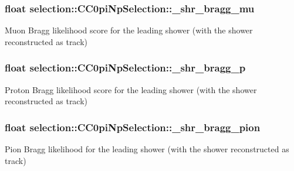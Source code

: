 \subsubsection[{\texorpdfstring{\+\_\+shr\+\_\+bragg\+\_\+mu}{_shr_bragg_mu}}]{\setlength{\rightskip}{0pt plus 5cm}float selection\+::\+C\+C0pi\+Np\+Selection\+::\+\_\+shr\+\_\+bragg\+\_\+mu\hspace{0.3cm}{\ttfamily [private]}}\hypertarget{classselection_1_1CC0piNpSelection_a6ef67d022fce5058985773010161b7cb}{}\label{classselection_1_1CC0piNpSelection_a6ef67d022fce5058985773010161b7cb}
Muon Bragg likelihood score for the leading shower (with the shower reconstructed as track) 
\subsubsection[{\texorpdfstring{\+\_\+shr\+\_\+bragg\+\_\+p}{_shr_bragg_p}}]{\setlength{\rightskip}{0pt plus 5cm}float selection\+::\+C\+C0pi\+Np\+Selection\+::\+\_\+shr\+\_\+bragg\+\_\+p\hspace{0.3cm}{\ttfamily [private]}}\hypertarget{classselection_1_1CC0piNpSelection_acb447ca93f046abd1540291ba0d41e73}{}\label{classselection_1_1CC0piNpSelection_acb447ca93f046abd1540291ba0d41e73}
Proton Bragg likelihood score for the leading shower (with the shower reconstructed as track) 
\subsubsection[{\texorpdfstring{\+\_\+shr\+\_\+bragg\+\_\+pion}{_shr_bragg_pion}}]{\setlength{\rightskip}{0pt plus 5cm}float selection\+::\+C\+C0pi\+Np\+Selection\+::\+\_\+shr\+\_\+bragg\+\_\+pion\hspace{0.3cm}{\ttfamily [private]}}\hypertarget{classselection_1_1CC0piNpSelection_afa97d9a456bf2255e06c6c5226f25929}{}\label{classselection_1_1CC0piNpSelection_afa97d9a456bf2255e06c6c5226f25929}
Pion Bragg likelihood for the leading shower (with the shower reconstructed as track) 
